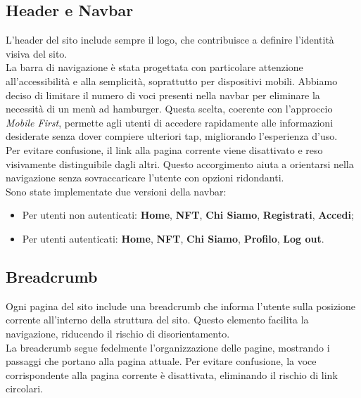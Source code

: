 \documentclass[10pt]{article}
\begin{document}
\subsection{Header e Navbar}
L'header del sito include sempre il logo, che contribuisce a definire l’identità visiva del sito.\\
La barra di navigazione è stata progettata con particolare attenzione all'accessibilità e alla semplicità, soprattutto per dispositivi mobili. Abbiamo deciso di limitare il numero di voci presenti nella navbar per eliminare la necessità di un menù ad hamburger. Questa scelta, coerente con l'approccio \textit{Mobile First}, permette agli utenti di accedere rapidamente alle informazioni desiderate senza dover compiere ulteriori tap, migliorando l’esperienza d’uso.\\
Per evitare confusione, il link alla pagina corrente viene disattivato e reso visivamente distinguibile dagli altri. Questo accorgimento aiuta a orientarsi nella navigazione senza sovraccaricare l'utente con opzioni ridondanti.\\

Sono state implementate due versioni della navbar:
\begin{itemize}
\item Per utenti non autenticati: \textbf{Home}, \textbf{NFT}, \textbf{Chi Siamo}, \textbf{Registrati}, \textbf{Accedi};
\item Per utenti autenticati: \textbf{Home}, \textbf{NFT}, \textbf{Chi Siamo}, \textbf{Profilo}, \textbf{Log out}.
\end{itemize}

\subsection{Breadcrumb}
Ogni pagina del sito include una breadcrumb che informa l'utente sulla posizione corrente all'interno della struttura del sito. Questo elemento facilita la navigazione, riducendo il rischio di disorientamento.\\
La breadcrumb segue fedelmente l’organizzazione delle pagine, mostrando i passaggi che portano alla pagina attuale. Per evitare confusione, la voce corrispondente alla pagina corrente è disattivata, eliminando il rischio di link circolari.
\end{document}
